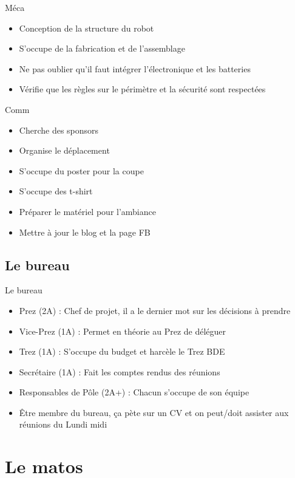\documentclass{beamer}
\begin{document}
\begin{frame}{Méca}
	\begin{itemize}
		\item Conception de la structure du robot
		\item S'occupe de la fabrication et de l'assemblage
		\item Ne pas oublier qu'il faut intégrer l'électronique et les batteries
		\item Vérifie que les règles sur le périmètre et la sécurité sont respectées
	\end{itemize}
\end{frame}

\begin{frame}{Comm}
	\begin{itemize}
		\item Cherche des sponsors
		\item Organise le déplacement
		\item S'occupe du poster pour la coupe
		\item S'occupe des t-shirt
		\item Préparer le matériel pour l'ambiance
		\item Mettre à jour le blog et la page FB
	\end{itemize}
\end{frame}

\subsection{Le bureau}
\begin{frame}{Le bureau}
	\begin{itemize}
		\item Prez (2A) : Chef de projet, il a le dernier mot sur les décisions à prendre
		\item Vice-Prez (1A) : Permet en théorie au Prez de déléguer
		\item Trez (1A) : S'occupe du budget et harcèle le Trez BDE
		\item Secrétaire (1A) : Fait les comptes rendus des réunions
		\item Responsables de Pôle (2A+) : Chacun s'occupe de son équipe
		\item \^Etre membre du bureau, ça pète sur un CV et on peut/doit assister aux réunions du Lundi midi 
	\end{itemize}
\end{frame}


\section{Le matos}
\end{document}
